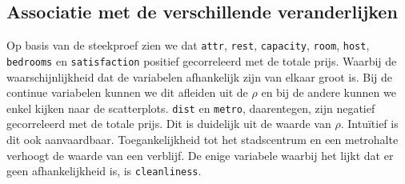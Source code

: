 \documentclass[a4paper]{kulakarticle}
\begin{document}
	\subsection{Associatie met de verschillende veranderlijken}
	
	Op basis van de steekproef zien we dat \verb*|attr|,  \verb*|rest|,  \verb*|capacity|,  \verb*|room|,  \verb*|host|,  \verb*|bedrooms| en  \verb*|satisfaction| positief gecorreleerd met de totale prijs. Waarbij de waarschijnlijkheid dat de variabelen afhankelijk zijn van elkaar groot is. Bij de continue variabelen kunnen we dit afleiden uit de $\rho$ en bij de andere kunnen we enkel kijken naar de scatterplots. \verb*|dist| en  \verb*|metro|, daarentegen, zijn negatief gecorreleerd met de totale prijs. Dit is duidelijk uit de waarde van $\rho$. Intuïtief is dit ook aanvaardbaar. Toegankelijkheid tot het stadscentrum en een metrohalte verhoogt de waarde van een verblijf. De enige variabele waarbij het lijkt dat er geen afhankelijkheid is, is  \verb*|cleanliness|.
\end{document}
